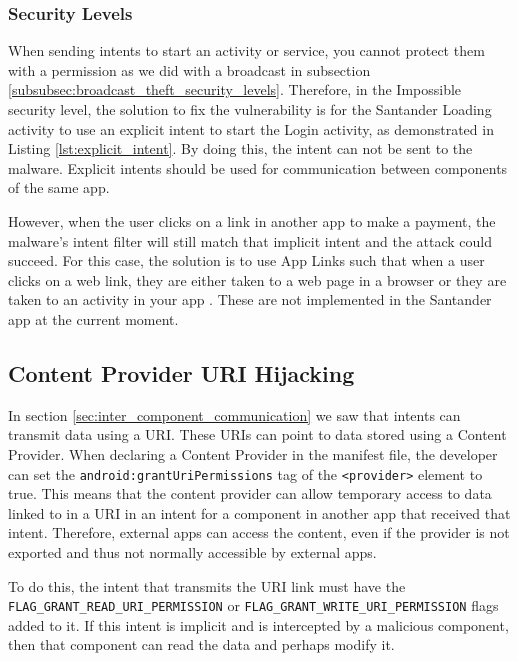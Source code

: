    \subsubsection{Security Levels}
        \label{subsubsec:activity_hijack_security_levels}
        
    When sending intents to start an activity or service, you cannot protect them with a permission as we did with a broadcast in subsection \ref{subsubsec:broadcast_theft_security_levels}. Therefore, in the Impossible security level, the solution to fix the vulnerability is for the Santander Loading activity to use an explicit intent to start the Login activity, as demonstrated in Listing \ref{lst:explicit_intent}. By doing this, the intent can not be sent to the malware. Explicit intents should be used for communication between components of the same app.

    However, when the user clicks on a link in another app to make a payment, the malware's intent filter will still match that implicit intent and the attack could succeed. For this case, the solution is to use App Links such that when a user clicks on a web link, they are either taken to a web page in a browser or they are taken to an activity in your app \cite{android_app_links}. These are not implemented in the Santander app at the current moment.
    
    \subsection{Content Provider URI Hijacking}
        \label{subsec:provider_uri_hijacking}
        
    In section \ref{sec:inter_component_communication} we saw that intents can transmit data using a URI. These URIs can point to data stored using a Content Provider. When declaring a Content Provider in the manifest file, the developer can set the \lstinline|android:grantUriPermissions| tag of the \lstinline|<provider>| element to true. This means that the content provider can allow temporary access to data linked to in a URI in an intent for a component in another app that received that intent. Therefore, external apps can access the content, even if the provider is not exported and thus not normally accessible by external apps.
    
    To do this, the intent that transmits the URI link must have the \lstinline|FLAG_GRANT_READ_URI_PERMISSION| or \lstinline|FLAG_GRANT_WRITE_URI_PERMISSION| flags added to it. If this intent is implicit and is intercepted by a malicious component, then that component can read the data and perhaps modify it.
    
